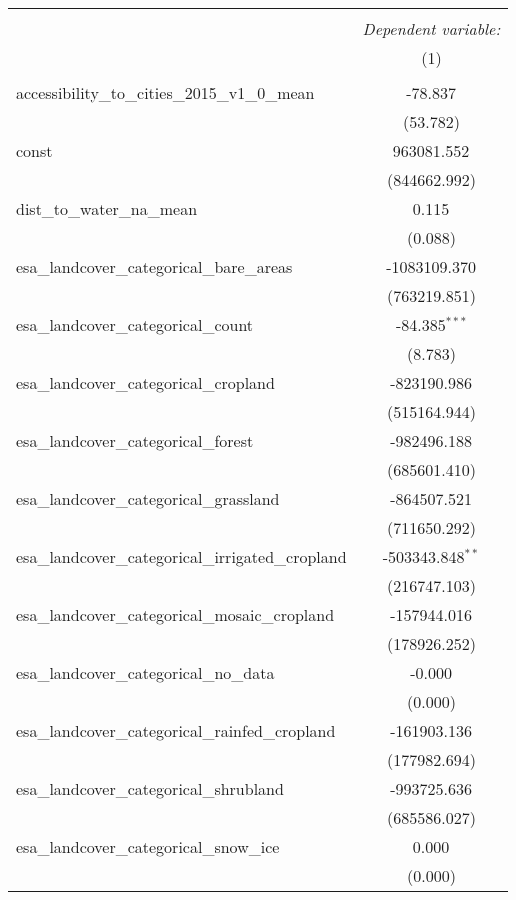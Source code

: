 \begin{table}[!htbp] \centering
\begin{tabular}{@{\extracolsep{5pt}}lc}
\\[-1.8ex]\hline
\hline \\[-1.8ex]
& \multicolumn{1}{c}{\textit{Dependent variable:}} \
\cr \cline{1-2}
\\[-1.8ex] & (1) \\
\hline \\[-1.8ex]
 accessibility_to_cities_2015_v1_0_mean & -78.837$^{}$ \\
  & (53.782) \\
 const & 963081.552$^{}$ \\
  & (844662.992) \\
 dist_to_water_na_mean & 0.115$^{}$ \\
  & (0.088) \\
 esa_landcover_categorical_bare_areas & -1083109.370$^{}$ \\
  & (763219.851) \\
 esa_landcover_categorical_count & -84.385$^{***}$ \\
  & (8.783) \\
 esa_landcover_categorical_cropland & -823190.986$^{}$ \\
  & (515164.944) \\
 esa_landcover_categorical_forest & -982496.188$^{}$ \\
  & (685601.410) \\
 esa_landcover_categorical_grassland & -864507.521$^{}$ \\
  & (711650.292) \\
 esa_landcover_categorical_irrigated_cropland & -503343.848$^{**}$ \\
  & (216747.103) \\
 esa_landcover_categorical_mosaic_cropland & -157944.016$^{}$ \\
  & (178926.252) \\
 esa_landcover_categorical_no_data & -0.000$^{}$ \\
  & (0.000) \\
 esa_landcover_categorical_rainfed_cropland & -161903.136$^{}$ \\
  & (177982.694) \\
 esa_landcover_categorical_shrubland & -993725.636$^{}$ \\
  & (685586.027) \\
 esa_landcover_categorical_snow_ice & 0.000$^{}$ \\
  & (0.000) \\

\end{tabular}
\end{table}
